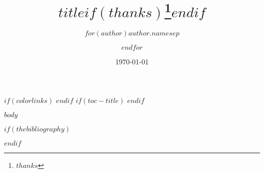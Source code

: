 \documentclass[$if(fontsize)$$fontsize$,$endif$$if(lang)$$babel-lang$,$endif$$if(papersize)$$papersize$paper,$endif$$if(beamer)$ignorenonframetext,$if(handout)$handout,$endif$$if(aspectratio)$aspectratio=$aspectratio$,$endif$$endif$, twoside,twocolumn]{book}
\title{$title$$if(thanks)$\thanks{$thanks$}$endif$}
\author{$for(author)$$author.name$$sep$ \and $endfor$}
\date{\today} %
\begin{document}
\maketitle


{
$if(colorlinks)$
\hypersetup{linkcolor=$if(toccolor)$$toccolor$$else$$endif$}
$endif$
\setcounter{tocdepth}{$toc-depth$}
$if(toc-title)$
\renewcommand*\contentsname{$toc-title$}
$endif$
\tableofcontents
}

$body$


$if(thebibliography)$
\begin{thebibliography}{99} %
 
\end{thebibliography}
$endif$

\end{document}
